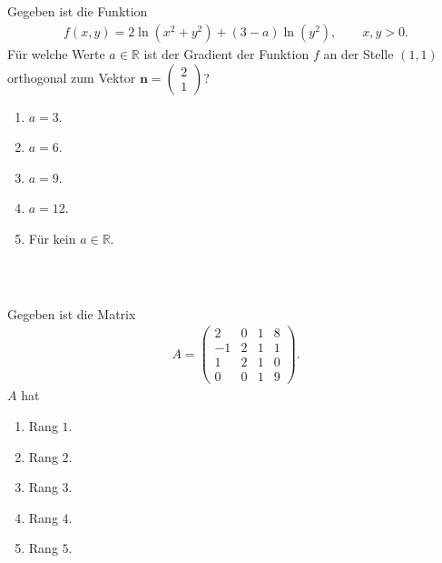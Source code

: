\subsection*{}
Gegeben ist die Funktion 
\begin{align*}
	f(x,y) = 2 \ln(x^2 +y^2 ) + (3-a) \ln(y^2), \qquad x,y > 0.
\end{align*}
Für welche Werte $ a \in \mathbb{R} $ ist der Gradient der Funktion $ f $ an der Stelle $ (1,1)  $ orthogonal zum Vektor $ \textbf{n} = \begin{pmatrix}2 \\ 1 \end{pmatrix} $?
\renewcommand{\labelenumi}{(\alph{enumi})}
\begin{enumerate}
\item 
$ a= 3 $.
\item 
$ a= 6 $.
\item
$ a= 9 $.
\item
$ a= 12 $.
\item
Für kein $ a \in \mathbb{R} $.
\end{enumerate}
\ \\
\subsection*{}
Gegeben ist die Matrix
\begin{align*}
	A =
	\begin{pmatrix}
		2 & 0 & 1 & 8 \\
		-1 & 2 & 1 & 1 \\
		1 & 2 & 1 &  0 \\
		0 & 0 & 1 & 9
	\end{pmatrix}.
\end{align*}
$ A $ hat
\renewcommand{\labelenumi}{(\alph{enumi})}
\begin{enumerate}
	\item 
	Rang $ 1 $.
	\item 
	Rang $ 2 $.
	\item
	Rang $ 3 $.
	\item
	Rang $ 4 $.
	\item
	Rang $ 5 $.
\end{enumerate}
\ \\
\newpage
